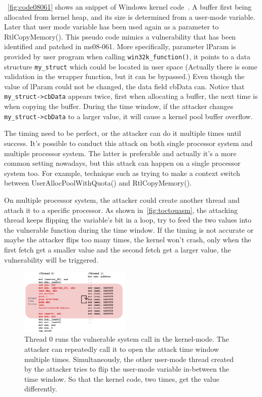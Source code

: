 ~\autoref{fig:code08061} shows an snippet of Windows kernel code~\cite{jurczyk2013identifying}. A buffer first being allocated from kernel heap, and its size is determined from a user-mode variable. Later that user mode variable has been used again as a parameter to RtlCopyMemory(). This pseudo code mimics a vulnerability that has been identified and patched in ms08-061. More specifically, parameter lParam is provided by user program when calling \texttt{win32k\_function()}, it points to a data structure \texttt{my\_struct} which could be located in user space (Actually there is some validation in the wrapper function, but it can be bypassed.) Even though the value of lParam could not be changed, the data field cbData can. Notice that \texttt{my\_struct->cbData} appears twice, first when allocating a buffer, the next time is when copying the buffer. During the time window, if the attacker changes \texttt{my\_struct->cbData} to a larger value, it will cause a kernel pool buffer overflow. 

The timing need to be perfect, or the attacker can do it multiple times until success. It's possible to conduct this attack on both single processor system and multiple processor system. The latter is preferable and actually it's a more common setting nowadays, but this attack can happen on a single processor system too. For example, technique such as trying to make a context switch between UserAllocPoolWithQuota() and RtlCopyMemory().

On multiple processor system, the attacker could create another thread and attach it to a specific processor. As shown in~\autoref{fig:toctouasm}, the attacking thread keeps flipping the variable's bit in a loop, try to feed the two values into the vulnerable function during the time window.
If the timing is not accurate or maybe the attacker flips too many times, the kernel won't crash, only when the first fetch get a smaller value and the second fetch get a larger value, the vulnerability will be triggered.

\begin{figure}[ht]
  \includegraphics[width=0.47\textwidth]{figures/toctouasm3}
  \centering
  \caption{Thread 0 runs the vulnerable system call in the kernel-mode. The attacker can repeatedly call it to open the attack time window multiple times. Simultaneously, the other user-mode thread created by the attacker tries to flip the user-mode variable in-between the time window. So that the kernel code, two times, get the value differently.}
  \label{fig:toctouasm}
\end{figure}



